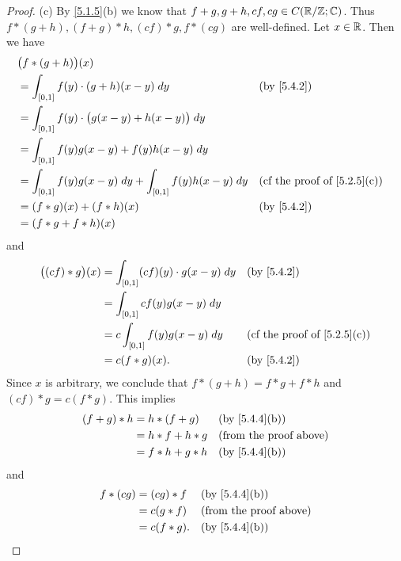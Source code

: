 \begin{proof}{(c)}
  By \cref{5.1.5}(b) we know that \(f + g, g + h, cf, cg \in C(\mathbb{R} / \mathbb{Z} ; \mathbb{C})\).
  Thus \(f * (g + h), (f + g) * h, (cf) * g, f * (cg)\) are well-defined.
  Let \(x \in \mathbb{R}\).
  Then we have
  \begin{align*}
     & \big(f * (g + h)\big)(x)                                                                                              \\
     & = \int_{[0, 1]} f(y) \cdot (g + h)(x - y) \; dy                         &  & \by{5.4.2}                               \\
     & = \int_{[0, 1]} f(y) \cdot \big(g(x - y) + h(x - y)\big) \; dy                                                        \\
     & = \int_{[0, 1]} f(y) g(x - y) + f(y) h(x - y) \; dy                                                                   \\
     & = \int_{[0, 1]} f(y) g(x - y) \; dy + \int_{[0, 1]} f(y) h(x - y) \; dy &  & \text{(cf the proof of \cref{5.2.5}(c))} \\
     & = (f * g)(x) + (f * h)(x)                                               &  & \by{5.4.2}                               \\
     & = (f * g + f * h)(x)
  \end{align*}
  and
  \begin{align*}
    \big((cf) * g\big)(x) & = \int_{[0, 1]} (cf)(y) \cdot g(x - y) \; dy &  & \by{5.4.2}                               \\
                          & = \int_{[0, 1]} c f(y) g(x - y) \; dy                                                      \\
                          & = c \int_{[0, 1]} f(y) g(x - y) \; dy        &  & \text{(cf the proof of \cref{5.2.5}(c))} \\
                          & = c (f * g)(x).                              &  & \by{5.4.2}
  \end{align*}
  Since \(x\) is arbitrary, we conclude that \(f * (g + h) = f * g + f * h\) and \((cf) * g = c (f * g)\).
  This implies
  \begin{align*}
    (f + g) * h & = h * (f + g)   &  & \text{(by \cref{5.4.4}(b))}   \\
                & = h * f + h * g &  & \text{(from the proof above)} \\
                & = f * h + g * h &  & \text{(by \cref{5.4.4}(b))}
  \end{align*}
  and
  \begin{align*}
    f * (cg) & = (cg) * f  &  & \text{(by \cref{5.4.4}(b))}   \\
             & = c(g * f)  &  & \text{(from the proof above)} \\
             & = c(f * g). &  & \text{(by \cref{5.4.4}(b))}
  \end{align*}
\end{proof}

